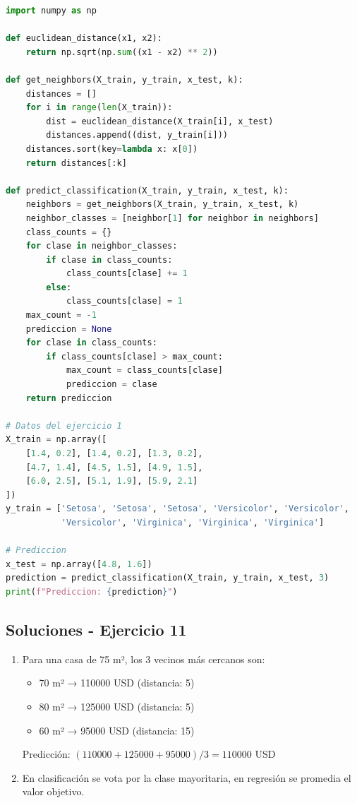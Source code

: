 \documentclass[12pt]{article}
\begin{document}
\begin{lstlisting}[language=Python]
import numpy as np

def euclidean_distance(x1, x2):
    return np.sqrt(np.sum((x1 - x2) ** 2))

def get_neighbors(X_train, y_train, x_test, k):
    distances = []
    for i in range(len(X_train)):
        dist = euclidean_distance(X_train[i], x_test)
        distances.append((dist, y_train[i]))
    distances.sort(key=lambda x: x[0])
    return distances[:k]

def predict_classification(X_train, y_train, x_test, k):
    neighbors = get_neighbors(X_train, y_train, x_test, k)
    neighbor_classes = [neighbor[1] for neighbor in neighbors]
    class_counts = {}
    for clase in neighbor_classes:
        if clase in class_counts:
            class_counts[clase] += 1
        else:
            class_counts[clase] = 1
    max_count = -1
    prediccion = None
    for clase in class_counts:
        if class_counts[clase] > max_count:
            max_count = class_counts[clase]
            prediccion = clase
    return prediccion

# Datos del ejercicio 1
X_train = np.array([
    [1.4, 0.2], [1.4, 0.2], [1.3, 0.2],
    [4.7, 1.4], [4.5, 1.5], [4.9, 1.5],
    [6.0, 2.5], [5.1, 1.9], [5.9, 2.1]
])
y_train = ['Setosa', 'Setosa', 'Setosa', 'Versicolor', 'Versicolor', 
           'Versicolor', 'Virginica', 'Virginica', 'Virginica']

# Prediccion
x_test = np.array([4.8, 1.6])
prediction = predict_classification(X_train, y_train, x_test, 3)
print(f"Prediccion: {prediction}")
\end{lstlisting}

\subsection{Soluciones - Ejercicio 11}

\begin{enumerate}
    \item Para una casa de 75 m², los 3 vecinos más cercanos son:
    \begin{itemize}
        \item 70 m² → 110000 USD (distancia: 5)
        \item 80 m² → 125000 USD (distancia: 5)
        \item 60 m² → 95000 USD (distancia: 15)
    \end{itemize}
    Predicción: $(110000 + 125000 + 95000) / 3 = 110000$ USD
    \item En clasificación se vota por la clase mayoritaria, en regresión se promedia el valor objetivo.
\end{enumerate}
\end{document}
